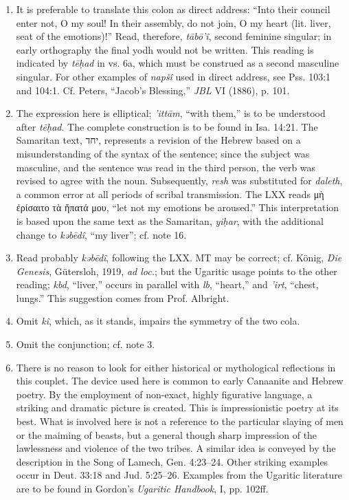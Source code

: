 \begin{enumerate}
The final suffix probably is to be read \emph{-ām}, with Sievers and Ball.

\item
It is preferable to translate this colon as direct address: ``Into their
council enter not, O my soul! In their assembly, do not join, O my heart
(lit. liver, seat of the emotions)!'' Read, therefore, \emph{tābō'î}, second
feminine singular; in early orthography the final yodh would not be written.
This reading is indicated by \emph{tēḥad} in vs. 6a, which must be construed
as a second masculine singular. For other examples of \emph{napšî} used in
direct address, see Pss. 103:1 and 104:1. Cf. Peters, ``Jacob's Blessing,''
\emph{JBL} VI (1886), p. 101.

\item
The expression here is elliptical; \emph{'ittām}, ``with them,'' is to be
understood after \emph{tēḥad}. The complete construction is to be found in
Isa. 14:21. The Samaritan text, יחד, represents a revision of the Hebrew based
on a misunderstanding of the syntax of the sentence; since the subject was
masculine, and the sentence was read in the third person, the verb was revised
to agree with the noun. Subsequently, \emph{resh} was substituted for
\emph{daleth}, a common error at all periods of scribal transmission. The LXX
reads μὴ ἐρίσαιτο τὰ ἥπατά μου, ``let not my emotions be aroused.'' This
interpretation is based upon the same text as the Samaritan, \emph{yiḥar},
with the additional change to \emph{kəbēdî}, ``my liver''; cf. note 16.

\item
Read probably \emph{kəbēdî}, following the LXX. MT may be correct; cf. König,
\emph{Die Genesis}, Gütersloh, 1919, \emph{ad loc.}; but the Ugaritic usage
points to the other reading; \emph{kbd}, ``liver,'' occurs in parallel with
\emph{lb}, ``heart,'' and \emph{'irt}, ``chest, lungs.'' This suggestion comes
from Prof. Albright.

\item
Omit \emph{kî}, which, as it stands, impairs the symmetry of the two cola.

\item
Omit the conjunction; cf. note 3.

\item
There is no reason to look for either historical or mythological reflections
in this couplet. The device used here is common to early Canaanite and Hebrew
poetry. By the employment of non-exact, highly figurative language, a striking
and dramatic picture is created. This is impressionistic poetry at its best.
What is involved here is not a reference to the particular slaying of men or
the maiming of beasts, but a general though sharp impression of the lawlessness
and violence of the two tribes. A similar idea is conveyed by the description
in the Song of Lamech, Gen. 4:23--24. Other striking examples occur in
Deut. 33:18 and Jud. 5:25--26. Examples from the Ugaritic literature are to be
found in Gordon's \emph{Ugaritic Handbook}, I, pp. 102ff.


\end{enumerate}
